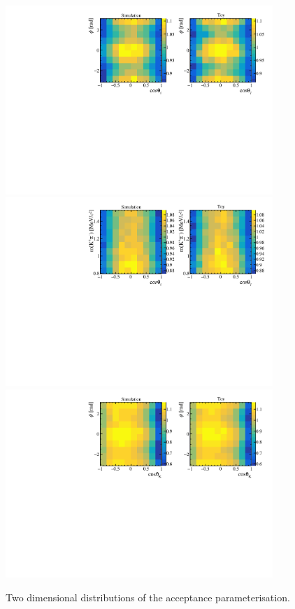 \begin{figure}[!tb]
 \centering
 \includegraphics[width=0.9\textwidth]{figs/kpimm/acceptance/2d/ctl_phi.pdf}
 \includegraphics[width=0.9\textwidth]{figs/kpimm/acceptance/2d/ctl_mkpi.pdf}
 \includegraphics[width=0.9\textwidth]{figs/kpimm/acceptance/2d/ctk_phi.pdf}
 \caption{Two dimensional distributions of the acceptance parameterisation.}
 \label{fig:acceptance:2d_3}
\end{figure}

